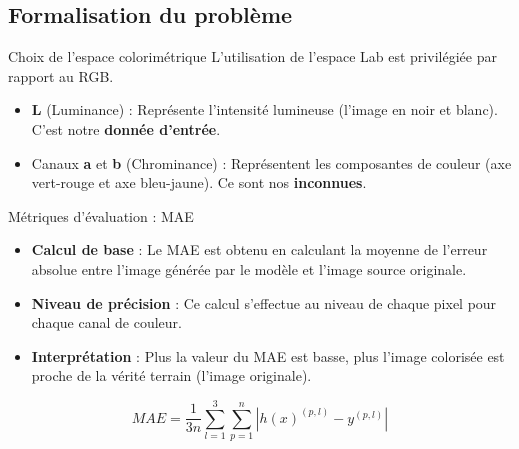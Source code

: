 \documentclass{beamer}
\begin{document}

\subsection{Formalisation du problème}


\begin{frame}{Choix de l'espace colorimétrique}
    L'utilisation de l'espace Lab est privilégiée par rapport au RGB.

    \vfill 

    \begin{itemize}
        \item \textbf{L} (Luminance) : Représente l'intensité lumineuse (l'image en noir et blanc). C'est notre \textbf{donnée d'entrée}.
        \item Canaux \textbf{a} et \textbf{b} (Chrominance) : Représentent les composantes de couleur (axe vert-rouge et axe bleu-jaune). Ce sont nos \textbf{inconnues}. 
    \end{itemize}
\end{frame}



\begin{frame}{Métriques d'évaluation : MAE}

\begin{itemize}
    \item \textbf{Calcul de base }: Le MAE est obtenu en calculant la moyenne de l'erreur absolue entre l'image générée par le modèle et l'image source originale.

    \item \textbf{Niveau de précision} : Ce calcul s'effectue au niveau de chaque pixel pour chaque canal de couleur.

    \item \textbf{Interprétation} : Plus la valeur du MAE est basse, plus l'image colorisée est proche de la vérité terrain (l'image originale).


\end{itemize}

\begin{equation}
    MAE = \frac{1}{3n} \sum_{l=1}^{3} \sum_{p=1}^{n} |h(x)^{(p,l)} - y^{(p,l)}|
\end{equation}

    
\end{frame}
\end{document}
